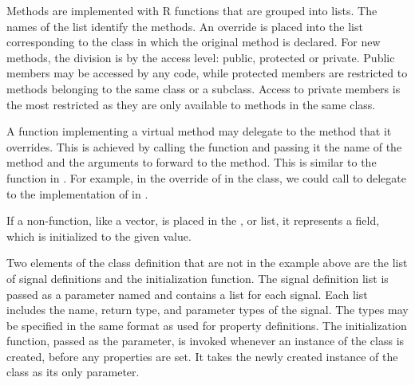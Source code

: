 Methods are implemented with R functions that are grouped into lists.
The names of the list identify the methods. An override is placed into
the list corresponding to the class in which the original method is
declared.  For new methods, the division is by the access level:
public, protected or private.  Public members may be accessed by any
code, while protected members are restricted to methods belonging to
the same class or a subclass. Access to private members is the most
restricted as they are only available to methods in the same class.

A function implementing a virtual method may delegate to the method
that it overrides. This is achieved by calling the
 function and passing it the name of the method
and the arguments to forward to the method. This is similar to the
 function in . For example, in the
override of  in the 
class, we could call  to
delegate to the implementation of  in
.

If a non-function, like a vector, is placed in the
,  or
 list, it represents a field, which is
initialized to the given value.

Two elements of the class definition that are not in the example above
are the list of signal definitions and the initialization function.
The signal definition list is passed as a parameter named
 and contains a list for each signal. Each list
includes the name, return type, and parameter types of the signal. The
types may be specified in the same format as used for property
definitions. The initialization function, passed as the
 parameter, is invoked whenever an instance of the
class is created, before any properties are set. It takes the newly
created instance of the class as its only parameter.

